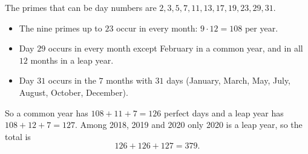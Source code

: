 The primes that can be day numbers are $2,3,5,7,11,13,17,19,23,29,31$.
\begin{itemize}
\item The nine primes up to $23$ occur in every month: $9\cdot12=108$ per year.
\item Day $29$ occurs in every month except February in a common year, and in all $12$ months in a leap year.
\item Day $31$ occurs in the $7$ months with $31$ days (January, March, May, July, August, October, December).
\end{itemize}
So a common year has $108+11+7=126$ perfect days and a leap year has $108+12+7=127$. Among 2018, 2019 and 2020 only 2020 is a leap year, so the total is
\[
126+126+127=\boxed{379}.
\]
